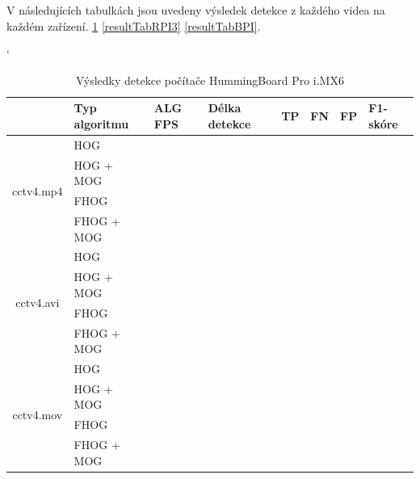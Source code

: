 V následujících tabulkách jsou uvedeny výsledek detekce z každého videa na každém zařízení. \ref{resultTabIMX} \ref{resultTabRPI3} \ref{resultTabBPI}.
\begin{table}[H]
\catcode`
\centering
\caption{Výsledky detekce počítače HummingBoard Pro i.MX6 }
\label{resultTabIMX}
\begin{tabular}{|c|l|l|l|l|l|l|l|}
\hline
                         & Typ algoritmu   	& ALG FPS & Délka detekce & TP & FN & FP & F1-skóre \\ \hline
\multirow{4}{*}{cctv4.mp4} & HOG        	&         &               &    &    &    &          \\ \cline{2-8} 
                         & HOG + MOG  		&         &               &    &    &    &          \\ \cline{2-8} 
                         & FHOG       		&         &               &    &    &    &          \\ \cline{2-8} 
                         & FHOG + MOG 		&         &               &    &    &    &          \\ \hline\hline 
\multirow{4}{*}{cctv4.avi} & HOG        	&         &               &    &    &    &          \\ \cline{2-8} 
                         & HOG + MOG  		&         &               &    &    &    &          \\ \cline{2-8} 
                         & FHOG       		&         &               &    &    &    &          \\ \cline{2-8} 
                         & FHOG + MOG 		&         &               &    &    &    &          \\ \hline \hline
\multirow{4}{*}{cctv4.mov} & HOG        	&         &               &    &    &    &          \\ \cline{2-8} 
                         & HOG + MOG  		&         &               &    &    &    &          \\ \cline{2-8} 
                         & FHOG       		&         &               &    &    &    &          \\ \cline{2-8} 
                         & FHOG + MOG 		&         &               &    &    &    &          \\ \hline
\end{tabular}
\end{table}


